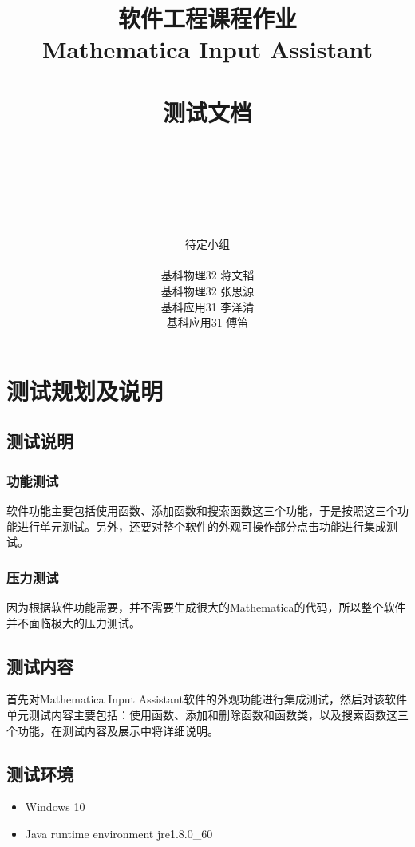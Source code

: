 \documentclass[hyperref, UTF8
,bookmarksnumbered=true, oneside]{ctexbook}
\title{\huge{软件工程课程作业}\\ \Huge \textbf{Mathematica Input Assistant} \\\phantom{aaa} \\\Huge{测试文档}}
\author{\\ \phantom{aaa} \\\phantom{aaa} \\ \phantom{aaa}\\\\\\\huge{待定小组}\\\\ \Large{基科物理32{  }蒋文韬}\\ \Large{基科物理32{ }张思源{ }}\\ \Large{基科应用31{  }李泽清{ }} \\ \Large{基科应用31 { }傅笛{ }} }
\begin{document}
\Large

\frontmatter
\maketitle

\tableofcontents

\mainmatter

\chapter{测试规划及说明}

	\section{测试说明} %

		\subsection{功能测试} %
软件功能主要包括使用函数、添加函数和搜索函数这三个功能，于是按照这三个功能进行单元测试。另外，还要对整个软件的外观可操作部分点击功能进行集成测试。
		

		\subsection{压力测试} %
因为根据软件功能需要，并不需要生成很大的Mathematica的代码，所以整个软件并不面临极大的压力测试。
		
		

	\section{测试内容} %
首先对Mathematica Input Assistant软件的外观功能进行集成测试，然后对该软件单元测试内容主要包括：使用函数、添加和删除函数和函数类，以及搜索函数这三个功能，在测试内容及展示中将详细说明。
	

	\section{测试环境} %
		\begin{itemize}
			\item Windows 10
			\item Java runtime environment jre1.8.0\_60
		\end{itemize}
	
\end{document}
